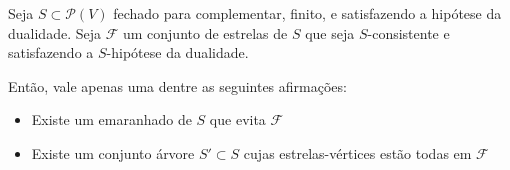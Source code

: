 \begin{teorema*}
  Seja $S \subset \mathcal{P}(V)$ fechado para complementar, finito, e satisfazendo a hipótese da dualidade. Seja $\mathcal{F}$ um conjunto de estrelas de $S$ que seja $S$-consistente e satisfazendo a $S$-hipótese da dualidade.

  Então, vale apenas uma dentre as seguintes afirmações:

\begin{itemize}[label=]
  \item Existe um emaranhado de $S$ que evita $\mathcal{F}$
  \item Existe um conjunto árvore $S' \subset S$ cujas estrelas-vértices estão todas em $\mathcal{F}$
\end{itemize}
  \end{teorema*}
